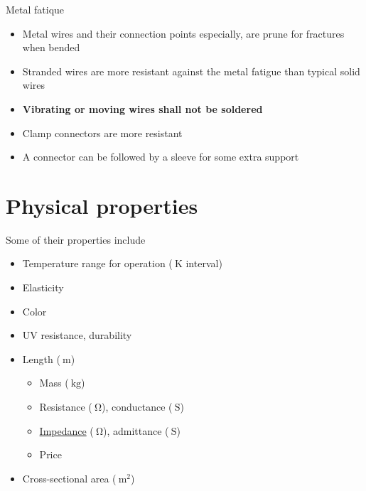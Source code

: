 \documentclass{beamer}
\begin{document}
\begin{frame}[label=fatique]{Metal fatique}
 \begin{itemize}
  \item Metal wires and their connection points especially, are prune for fractures when bended
  \item Stranded wires are more resistant against the metal fatigue than typical solid wires
  \item \textbf{Vibrating or moving wires shall not be soldered}
  \item Clamp connectors are more resistant
  \item A connector can be followed by a sleeve for some extra support
 \end{itemize}
\end{frame}

\section{Physical properties}

\begin{frame}{Some of their properties include}
 \begin{itemize}
  \item Temperature range for operation ($\SI{}{\kelvin}$ interval)
  \item Elasticity
  \item Color
  \item UV resistance, durability
  \item Length ($\SI{}{\meter}$)
   \begin{itemize}
    \item Mass ($\SI{}{\kilo\gram}$)
    \item Resistance ($\SI{}{\ohm}$), conductance ($\SI{}{\siemens}$)
    \item \hyperlink{impedance}{Impedance} ($\SI{}{\ohm}$), admittance ($\SI{}{\siemens}$)
    \item Price
   \end{itemize}
  \item Cross-sectional area ($\SI{}{\meter^2}$)~\cite{iec2004}
 \end{itemize}
\end{frame}
\end{document}
